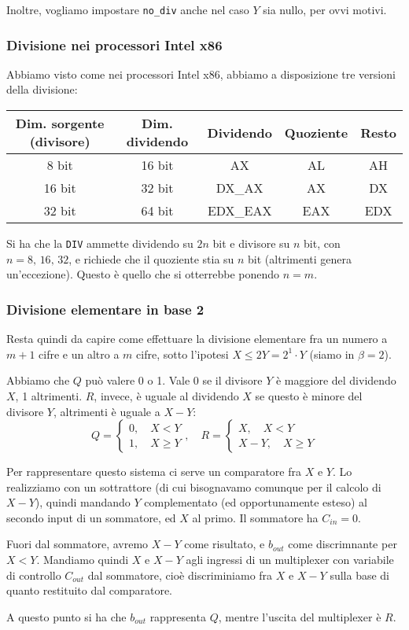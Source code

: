 \documentclass[a4paper,11pt]{article}
\begin{document}
Inoltre, vogliamo impostare \lstinline|no_div| anche nel caso $Y$ sia nullo, per ovvi motivi.

\subsubsection{Divisione nei processori Intel x86}
Abbiamo visto come nei processori Intel x86, abbiamo a disposizione tre versioni della divisione:

\begin{table}[h!]
	\center {}
	\begin{tabular} { c | c | c | c | c }
		\bfseries Dim. sorgente (divisore) & \bfseries Dim. dividendo & \bfseries Dividendo & \bfseries Quoziente & \bfseries Resto \\ 
		\hline 
		8 bit & 16 bit & AX & AL & AH \\ 
		16 bit & 32 bit & DX\_AX & AX & DX \\ 
		32 bit & 64 bit & EDX\_EAX & EAX & EDX
	\end{tabular}
\end{table}

Si ha che la \lstinline|DIV| ammette dividendo su $2n$ bit e divisore su $n$ bit, con $n = 8, \, 16, \, 32$, e richiede che il quoziente stia su $n$ bit (altrimenti genera un'eccezione).
Questo è quello che si otterrebbe ponendo $n = m$.

\subsubsection{Divisione elementare in base 2}
Resta quindi da capire come effettuare la divisione elementare fra un numero a $m+1$ cifre e un altro a $m$ cifre, sotto l'ipotesi $X \leq 2Y = 2^1 \cdot Y$ (siamo in $\beta=2$).

Abbiamo che $Q$ può valere 0 o 1. Vale 0 se il divisore $Y$ è maggiore del dividendo $X$, 1 altrimenti.
$R$, invece, è uguale al dividendo $X$ se questo è minore del divisore $Y$, altrimenti è uguale a $X - Y$:
$$
Q=
\begin{cases}
	0, \quad X < Y \\ 
	1, \quad X \geq Y
\end{cases}, \quad 
R =
\begin{cases}
	X, \quad X < Y \\ 
	X-Y, \quad X \geq Y
\end{cases}
$$

Per rappresentare questo sistema ci serve un comparatore fra $X$ e $Y$. 
Lo realizziamo con un sottrattore (di cui bisognavamo comunque per il calcolo di $X-Y$), quindi mandando $Y$ complementato (ed opportunamente esteso) al secondo input di un sommatore, ed $X$ al primo. 
Il sommatore ha $C_{in} = 0$.

Fuori dal sommatore, avremo $X-Y$ come risultato, e $b_{out}$ come discrimnante per $X < Y$.
Mandiamo quindi $X$ e $X-Y$ agli ingressi di un multiplexer con variabile di controllo $C_{out}$ dal sommatore,
cioè discriminiamo fra $X$ e $X-Y$ sulla base di quanto restituito dal comparatore.

A questo punto si ha che $b_{out}$ rappresenta $Q$, mentre l'uscita del multiplexer è $R$.
\end{document}
